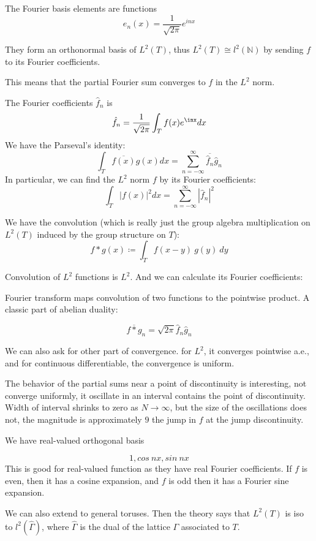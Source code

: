 \documentclass[main.tex]{subfiles}
\begin{document}
The Fourier basis elements are functions
$$
e_n(x) = \frac{1}{\sqrt{2 \pi}} e^{inx}
$$

\begin{theorem}
They form an orthonormal basis of $L^2(T)$, thus $L^2(T) \cong l^2(\mathbb{N})$ by sending $f$ to its Fourier coefficients.
\end{theorem}

This means that the partial Fourier sum converges to $f$ in the $L^2$ norm. 

The Fourier coefficients $\hat{f}_n$ is 
$$
\hat{f}_n = \frac{1}{\sqrt{2 \pi}} \int_T f(x) e^{\inx} dx
$$
We have the Parseval's identity:
$$
\int_T \overline{f(x)} g(x) dx = \sum_{n = -\infty} ^{\infty} \overline{\hat{f}_n} \hat{g}_n
$$
In particular, we can find the $L^2$ norm $f$ by its Fourier coefficients:
$$
\int_T |f(x)|^2 dx = \sum_{n = -\infty} ^{\infty} |\hat{f}_n|^2
$$

We have the convolution (which is really just the group algebra multiplication on $L^2(T)$ induced by the group structure on $T$):
$$
f * g(x) \coloneqq \int_T f(x-y)\ g(y)\  dy
$$

Convolution of $L^2$ functions is $L^2$. And we can calculate its Fourier coefficients:

Fourier transform maps convolution of two functions to the pointwise product. A classic part of abelian duality:
\begin{theorem}
$$
\overline{f * g}_n = \sqrt{2\pi} \hat{f}_n \hat{g}_n
$$
\end{theorem}

We can also ask for other part of convergence. for $L^2$, it converges pointwise a.e., and for continuous differentiable, the convergence is uniform.

The behavior of the partial sums near a point of discontinuity is interesting, not converge uniformly, it oscillate in an interval contains the point of discontinuity. Width of interval shrinks to zero as $N \rightarrow \infty$, but the size of the oscillations does not, the magnitude is approximately $9$ the jump in $f$ at the jump discontinuity.

We have real-valued orthogonal basis 

$$
1, cos\ nx, sin\ nx
$$
This is good for real-valued function as they have real Fourier coefficients. If $f$ is even, then it has a cosine expansion, and $f$ is odd then it has a Fourier sine expansion.

We can also extend to general toruses. Then the theory says that $L^2(T)$ is iso to $l^2(\hat{\Gamma})$, where $\hat{\Gamma}$ is the dual of the lattice $\Gamma$ associated to $T$.
\end{document}
